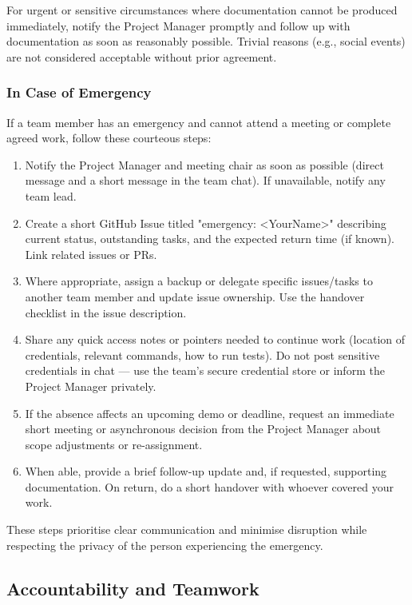 \documentclass{article}
\begin{document}
\begin{enumerate}
For urgent or sensitive circumstances where documentation cannot be produced immediately, notify the Project Manager promptly and follow up with documentation as soon as reasonably possible. Trivial reasons (e.g., social events) are not considered acceptable without prior agreement.

\subsubsection*{In Case of Emergency}

If a team member has an emergency and cannot attend a meeting or complete agreed work, follow these courteous steps:
\begin{enumerate}
  \item Notify the Project Manager and meeting chair as soon as possible (direct message and a short message in the team chat). If unavailable, notify any team lead.
  \item Create a short GitHub Issue titled "emergency: <YourName>" describing current status, outstanding tasks, and the expected return time (if known). Link related issues or PRs.
  \item Where appropriate, assign a backup or delegate specific issues/tasks to another team member and update issue ownership. Use the handover checklist in the issue description.
  \item Share any quick access notes or pointers needed to continue work (location of credentials, relevant commands, how to run tests). Do not post sensitive credentials in chat — use the team's secure credential store or inform the Project Manager privately.
  \item If the absence affects an upcoming demo or deadline, request an immediate short meeting or asynchronous decision from the Project Manager about scope adjustments or re-assignment.
  \item When able, provide a brief follow-up update and, if requested, supporting documentation. On return, do a short handover with whoever covered your work.
\end{enumerate}

These steps prioritise clear communication and minimise disruption while respecting the privacy of the person experiencing the emergency.

\subsection*{Accountability and Teamwork}


\end{enumerate}
\end{document}
